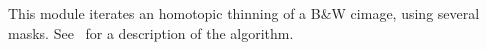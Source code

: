 This module iterates an homotopic thinning of a B\&W cimage, using
several masks.
See~\cite{pasquignon:approximation} for a description of the algorithm.

